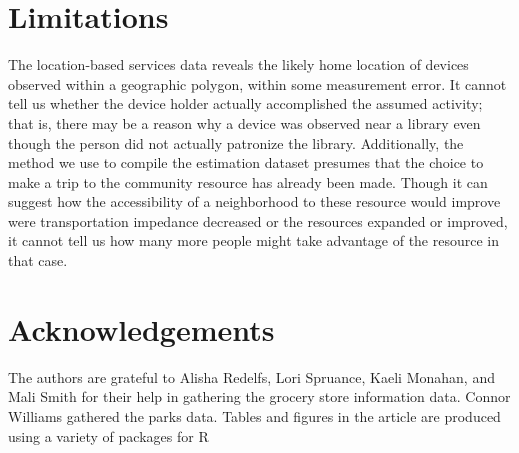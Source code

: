 \documentclass[3p, authoryear]{elsarticle} %
\begin{document}
\hypertarget{limitations}{%
\section{Limitations}\label{limitations}}

The location-based services data reveals the likely home location of devices
observed within a geographic polygon, within some measurement error.
It cannot tell us whether the device holder actually accomplished the assumed
activity; that is, there may be a reason why a device was observed near a
library even though the person did not actually patronize the library.
Additionally, the method we use to compile the estimation dataset presumes that
the choice to make a trip to the community resource has already been made. Though
it can suggest how the accessibility of a neighborhood to these resource would improve
were transportation impedance decreased or the resources expanded or improved,
it cannot tell us how many more people might take advantage of the resource
in that case.

\hypertarget{acknowledgements}{%
\section*{Acknowledgements}\label{acknowledgements}}

The authors are grateful to Alisha Redelfs, Lori Spruance, Kaeli Monahan, and
Mali Smith for their help in gathering the grocery store information data.
Connor Williams gathered the parks data. Tables and figures in the article are
produced using a variety of packages for R \citep{modelsummary, ggspatial}


\end{document}
